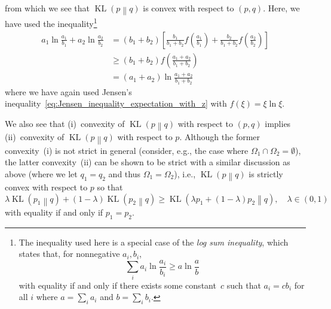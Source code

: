 \documentclass[12pt,a4paper]{article}
\begin{document}
from which we see that
$\operatorname{KL}\left(p\middle\|q\right)$ is convex with respect to $(p, q)$.
Here, we have used the inequality\footnote{%
The inequality used here is a special case of the \emph{log sum inequality},
which states that, for nonnegative $a_i, b_i$,
\begin{equation}
\sum_i a_i \ln \frac{a_i}{b_i} \geqslant a \ln \frac{a}{b}
\end{equation}
with equality if and only if there exists some constant~$c$ such that $a_i = c b_i$ for all $i$
where $a = \sum_i a_i$ and $b = \sum_i b_i$.}
\begin{align}
a_1 \ln\frac{a_1}{b_1} +
a_2 \ln\frac{a_2}{b_2}
&=
\left( b_1 + b_2 \right)
\left[
\frac{b_1}{ b_1 + b_2 } f\left(\frac{a_1}{b_1}\right) +
\frac{b_2}{ b_1 + b_2 } f\left(\frac{a_2}{b_2}\right)
\right]
\\
&\geqslant
\left( b_1 + b_2 \right)
f\left(\frac{ a_1 + a_2 }{ b_1 + b_2 }\right)
\\
&=
\left( a_1 + a_2 \right)
\ln \frac{ a_1 + a_2 }{ b_1 + b_2 }
\end{align}
where we have again used Jensen's inequality~\eqref{eq:Jensen_inequality_expectation_with_z}
with $f(\xi) = \xi \ln \xi$.

We also see that
(i)~convexity of $\operatorname{KL}\left(p\middle\|q\right)$ with respect to $(p, q)$ implies
(ii)~convexity of $\operatorname{KL}\left(p\middle\|q\right)$ with respect to $p$.
Although the former convexity~(i) is not strict in general
(consider, e.g., the case where $\Omega_1 \cap \Omega_2 = \emptyset$),
the latter convexity~(ii) can be shown to be strict with a similar discussion as above
(where we let $q_1 = q_2$ and thus $\Omega_1 = \Omega_2$), i.e.,
$\operatorname{KL}\left(p\middle\|q\right)$ is strictly convex with respect to $p$
so that
\begin{equation}
\lambda \operatorname{KL}\left( p_1 \middle\| q \right) +
(1 - \lambda) \operatorname{KL}\left( p_2 \middle\| q \right)
\geqslant \operatorname{KL}\left( \lambda p_1 + (1 - \lambda) p_2 \middle\|q\right) ,
\quad \lambda \in (0, 1)
\label{eq:strict_convexity_of_KL_wrt_p}
\end{equation}
with equality if and only if $p_1 = p_2$.
\end{document}
